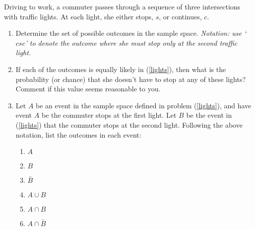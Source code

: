   \item
    Driving to work, a commuter passes through a sequence of three
    intersections with traffic lights. At each light, she either stops, $s$, or continues, $c$.
    \begin{enumerate}
      \item %
        \label{lights}
        Determine the set of possible outcomes in the sample space.
        \emph{Notation: use `$csc$' to denote the outcome where she must stop only at the second traffic light.}



      \item %
        If each of the outcomes is equally likely in (\ref{lights}), then
        what is the probability (or chance) that she doesn't have to stop at any of these lights?
        Comment if  this value seems reasonable to you.

      \item \label{eventlights}
        Let $A$ be an event in the sample space defined in problem (\ref{lights}),
        and have event $A$ be the commuter stops at the first light.
        Let $B$ be the event in (\ref{lights}) that the commuter stops at the second light.
        Following the above notation, list the outcomes in each event:
        \begin{enumerate}
          \item $A$
          \item $B$
          \item $\bar{B}$
          \item $A \cup B$
          \item $A \cap B$
          \item $A \cap \bar{B}$
        \end{enumerate}
    \end{enumerate}
